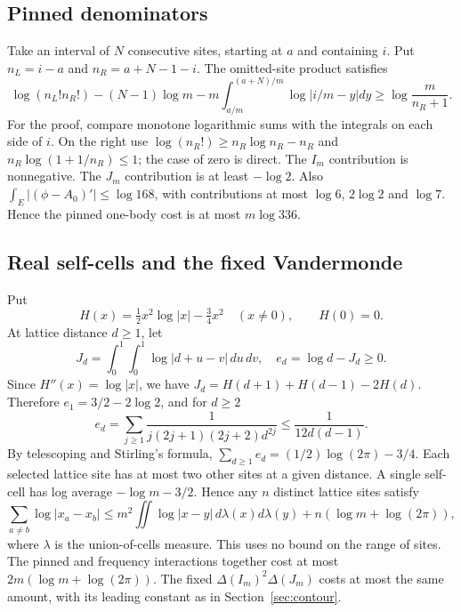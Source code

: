 \subsection{Pinned denominators}
Take an interval of \(N\) consecutive sites, starting at \(a\) and
containing \(i\). Put \(n_L=i-a\) and \(n_R=a+N-1-i\). The omitted-site
product satisfies
\begin{equation}\label{eq:config-pinned}
 \log(n_L!n_R!)-(N-1)\log m
 -m\int_{a/m}^{(a+N)/m}\log|i/m-y|dy
 \ge\log\frac{m}{n_R+1}.
\end{equation}
For the proof, compare monotone logarithmic sums with the integrals on each
side of \(i\). On the right use \(\log(n_R!)\ge n_R\log n_R-n_R\) and
\(n_R\log(1+1/n_R)\le1\); the case of zero is direct. The \(I_m\)
contribution is nonnegative. The \(J_m\) contribution is at least
\(-\log2\). Also \(\int_E|(\phi-A_0)'|\le\log168\), with contributions at
most \(\log6\), \(2\log2\) and \(\log7\). Hence the pinned one-body cost is
at most \(m\log336\).

\subsection{Real self-cells and the fixed Vandermonde}
Put
\[
 H(x)=\tfrac12x^2\log|x|-\tfrac34x^2\quad(x\ne0),\qquad H(0)=0.
\]
At lattice distance \(d\ge1\), let
\[
 J_d=\int_0^1\int_0^1\log|d+u-v|\,du\,dv,
 \quad e_d=\log d-J_d\ge0.
\]
Since \(H''(x)=\log|x|\), we have \(J_d=H(d+1)+H(d-1)-2H(d)\). Therefore
\(e_1=3/2-2\log2\), and for \(d\ge2\)
\[
 e_d=\sum_{j\ge1}\frac1{j(2j+1)(2j+2)d^{2j}}
 \le\frac1{12d(d-1)}.
\]
By telescoping and Stirling's formula,
\(\sum_{d\ge1}e_d=(1/2)\log(2\pi)-3/4\). Each selected lattice site has at
most two other sites at a given distance. A single self-cell has log
average \(-\log m-3/2\). Hence any \(n\) distinct lattice sites satisfy
\begin{equation}\label{eq:config-self}
 \sum_{a\ne b}\log|x_a-x_b|
 \le m^2\iint\log|x-y|\,d\lambda(x)d\lambda(y)
                        +n(\log m+\log(2\pi)),
\end{equation}
where \(\lambda\) is the union-of-cells measure. This uses no bound on the
range of sites. The pinned and frequency interactions together cost at most
\(2m(\log m+\log(2\pi))\). The fixed \(\Delta(I_m)^2\Delta(J_m)\) costs at
most the same amount, with its leading constant as in
Section~\ref{sec:contour}.

